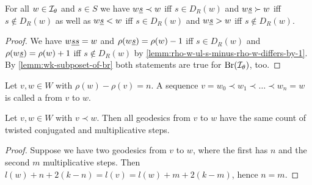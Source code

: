 \begin{prop}
	For all $w \in \mathcal{I}_{\theta}$ and $s \in S$ we have $w \underline{s} \prec w$ iff $s \in D_R(w)$ and $w \underline{s} \succ w$ iff $s \notin D_R(w)$ as well as $w \underline{s} < w$ iff $s \in D_R(w)$ and $w \underline{s} > w$ iff $s \notin D_R(w)$.

	\begin{proof}
		We have $w \underline{s} \underline{s} = w$ and $\rho(w \underline{s}) = \rho(w) - 1$ iff $s \in D_R(w)$ and $\rho(w \underline{s}) = \rho(w) + 1$ iff $s \notin D_R(w)$ by \ref{lemm:rho-w-ul-s-minus-rho-w-differs-by-1}. By \ref{lemm:wk-subposet-of-br} both statements are true for $\operatorname{Br}(\mathcal{I}_{\theta})$, too.
	\end{proof}
\end{prop}

\begin{defi}
	Let $v,w \in W$ with $\rho(w) - \rho(v) = n$. A sequence $v = w_0 \prec w_1 \prec \ldots \prec w_n = w$ is called a  from $v$ to $w$.
\end{defi}

\begin{prop}
	Let $v,w \in W$ with $v \prec w$. Then all geodesics from $v$ to $w$ have the same count of twisted conjugated and multiplicative steps.

	\begin{proof}
		Suppose we have two geodesics from $v$ to $w$, where the first has $n$ and the second $m$ multiplicative steps. Then $l(w) + n + 2(k-n) = l(v) = l(w) + m + 2(k-m)$, hence $n = m$.
	\end{proof}
\end{prop}

